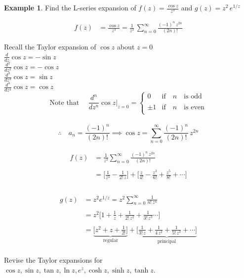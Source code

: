 \documentclass[11pt,a4paper]{article}
\theoremstyle{definition}
\newtheorem{example}[thm]{Example}
\begin{document}
\begin{example}
Find the L-series expansion of $f(z) = \frac{\cos z}{z^3}$ and $g(z) = z^2\,e^{1/z}$

\begin{align*}
f(z) &  = \frac{\cos z}{z^3}  = \frac{1}{z^3}\,\sum^{\infty}_{n = 0}\frac{(-1)^n\, z^{2n}}{(2n)!}
\end{align*}

Recall the Taylor expansion of $\cos z$ about $z = 0$\\

$\displaystyle{\frac{d}{dz}\cos z = - \sin z}$\\

$\displaystyle{\frac{d^2}{dz^2}\cos z = -\cos z}$\\

$\displaystyle{\frac{d^3}{dz^3}\cos z = \sin z}$\\

$\displaystyle{\frac{d^4}{dz^4}\cos z = \cos z}$\\


$$\text{Note that }\quad \frac{d^n}{dz^n}\cos z\Bigg|_{z = 0} = \begin{cases}
0 & \text{if}\quad  n\quad \text{is odd}\\\\
\pm 1 & \text{if}\quad n \quad \text{is even}\\
\end{cases}$$\\


$$\therefore\quad a_n = \frac{(-1)^n}{(2n)!}\implies \cos z = \sum^{\infty}_{n = 0} \frac{(-1)^n}{(2n)!}\,z^{2n}$$


\begin{align*}
f(z) & = \frac{1}{z^3}\sum^{\infty}_{n = 0} \frac{(-1)^n\,z^{2n}}{(2n)!}\\\\
& = \Big[\frac{1}{z^3} - \frac{1}{2!\,z}\Big] + \Big[\frac{z}{4!} -\frac{z^3}{6!} + \frac{z^5}{8!}+ \cdots\Big]\\\\
\end{align*}



\begin{align*}
g(z) & = z^2 e^{1/z} = z^2\sum^{\infty}_{n = 0} \frac{1}{n!\,z^n}\\\\
& = z^2 \Big[1 + \frac{1}{z} + \frac{1}{2!\,z^2} + \frac{1}{3!\,z^3}\cdots\Big]\\\\
& = \underbrace{\Big[z^2 + z + \frac{1}{2!}\Big]}_{\text{regular}} + \underbrace{\Big[\frac{1}{3!\,z} + \frac{1}{4\,z^2} + \frac{1}{5!\,z^3} + \cdots\Big]}_{\text{principal}}\\
\end{align*}

Revise the Taylor expansions for $\cos z , \sin z , \tan z, \ln z, e^z, \cosh z, \sinh z, \tanh z$.
\end{example}
\end{document}
